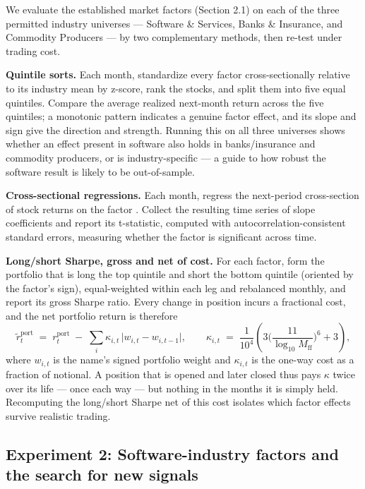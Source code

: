 \documentclass[11pt]{article}
\newcommand{\Mff}{M_{\mathrm{ff}}}
\begin{document}
We evaluate the established market factors (Section 2.1) on each of the three permitted
industry universes --- Software \& Services, Banks \& Insurance, and Commodity Producers
--- by two complementary methods, then re-test under trading cost.

\textbf{Quintile sorts.} Each month, standardize every factor cross-sectionally relative to
its industry mean by z-score, rank the stocks, and split them into five equal quintiles.
Compare the average realized next-month return across the five quintiles; a monotonic
pattern indicates a genuine factor effect, and its slope and sign give the direction and
strength. Running this on all three universes shows whether an effect present in software
also holds in banks/insurance and commodity producers, or is industry-specific --- a guide
to how robust the software result is likely to be out-of-sample.

\textbf{Cross-sectional regressions.} Each month, regress the next-period cross-section of
stock returns on the factor \citep{famamacbeth1973}. Collect the resulting time series of
slope coefficients and report its t-statistic, computed with autocorrelation-consistent
standard errors, measuring whether the factor is significant across
time.

\textbf{Long/short Sharpe, gross and net of cost.} For each factor, form the portfolio that
is long the top quintile and short the bottom quintile (oriented by the factor's sign),
equal-weighted within each leg and rebalanced monthly, and report its gross Sharpe ratio.
Every change in position incurs a fractional cost, and the net portfolio return is therefore
\begin{equation}
  \tilde{r}^{\text{port}}_t \;=\; r^{\text{port}}_t \;-\;
  \sum_i \kappa_{i,t}\,\lvert w_{i,t} - w_{i,t-1}\rvert,
  \qquad
  \kappa_{i,t} \;=\; \frac{1}{10^4}\left(3\Big(\frac{11}{\log_{10}\Mff}\Big)^{6} + 3\right),
\end{equation}
where $w_{i,t}$ is the name's signed portfolio weight and $\kappa_{i,t}$ is the one-way cost
as a fraction of notional. A position that is opened and later closed thus pays $\kappa$ twice
over its life --- once each way --- but nothing in the months it is simply held. Recomputing
the long/short Sharpe net of this cost isolates which factor effects survive realistic
trading.

\subsection{Experiment 2: Software-industry factors and the search for new signals}
\end{document}
